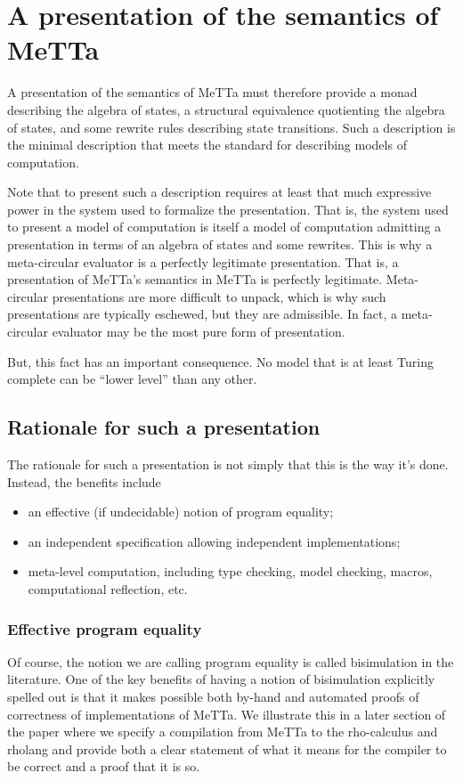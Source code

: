 \section{A presentation of the semantics of MeTTa}

A presentation of the semantics of MeTTa must therefore provide a monad describing the algebra of states, a structural equivalence quotienting the algebra of states, and some rewrite rules describing state transitions. Such a description is the minimal description that meets the standard for describing models of computation. 


Note that to present such a description requires at least that much expressive power in the system used to formalize the presentation. That is, the system used to present a model of computation is itself a model of computation admitting a presentation in terms of an algebra of states and some rewrites. This is why a meta-circular evaluator is a perfectly legitimate presentation. That is, a presentation of MeTTa’s semantics in MeTTa is perfectly legitimate. Meta-circular presentations are more difficult to unpack, which is why such presentations are typically eschewed, but they are admissible. In fact, a meta-circular evaluator may be the most pure form of presentation.


But, this fact has an important consequence. No model that is at least Turing complete can be “lower level” than any other.

\subsection{Rationale for such a presentation}

The rationale for such a presentation is not simply that this is the way it’s done. Instead, the benefits include

\begin{itemize}
  \item an effective (if undecidable) notion of program equality;
  \item an independent specification allowing independent implementations;
  \item meta-level computation, including type checking, model checking, macros, computational reflection, etc.
\end{itemize}

\subsubsection{Effective program equality}
Of course, the notion we are calling program equality is called bisimulation in the literature. One of the key benefits of having a notion of bisimulation explicitly spelled out is that it makes possible both by-hand and automated proofs of correctness of implementations of MeTTa. We illustrate this in a later section of the paper where we specify a compilation from MeTTa to the rho-calculus and rholang and provide both a clear statement of what it means for the compiler to be correct and a proof that it is so.

